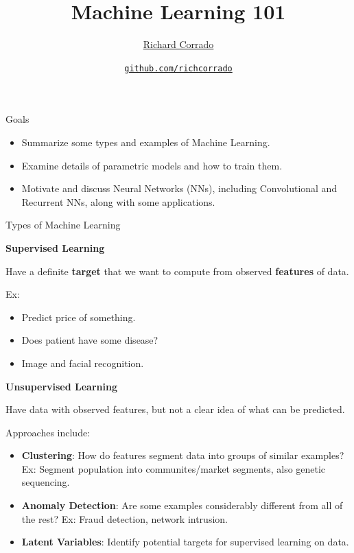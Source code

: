 \documentclass[12pt,t]{beamer}
\title{Machine Learning 101}
\author{\href{http://richcorrado.github.io}{Richard Corrado}}
\institute{Fat Cat Machine Learning}
\date{\href{https://github.com/richcorrado}{\tt \scriptsize github.com/richcorrado}}
\begin{document}
{
	\frame{
		\titlepage
} } 
	


\begin{frame}{Goals}

\begin{itemize}
\item Summarize some types and examples of Machine Learning.
\item Examine details of parametric models and how to train them.
\item Motivate and discuss Neural Networks (NNs), including Convolutional and Recurrent NNs, along with some applications.
\end{itemize}


\end{frame}

\begin{frame}{Types of Machine Learning}

{\bf Supervised Learning} 
\bigskip

 Have a definite {\bf target} that we want to compute from observed {\bf features} of data.  
\bigskip

Ex:
\begin{itemize}
\item   Predict price of something.
\item  Does patient have some disease?
\item Image and facial recognition.
\end{itemize}


\end{frame}

\begin{frame}

{\bf Unsupervised Learning}
\bigskip

 Have data with  observed features,  but not a clear idea of what can be predicted. 
\bigskip

Approaches include:

\begin{itemize}
\item {\bf Clustering}: How do features segment data into groups of similar examples? Ex: Segment population into communites/market segments,  also genetic sequencing.
\item {\bf Anomaly Detection}: Are some examples considerably different from all of the rest? Ex: Fraud detection, network intrusion.  
\item {\bf Latent Variables}: Identify potential targets for supervised learning on data.

\end{itemize}
\end{frame}
\end{document}
